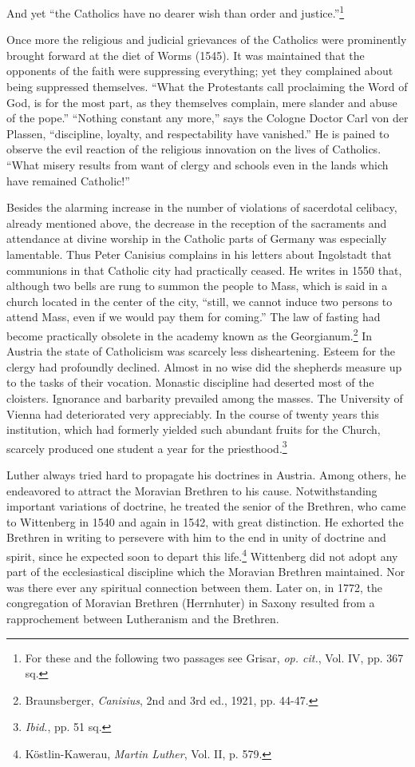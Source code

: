 And yet “the Catholics have no dearer wish than order and justice.”\footnote{For these and the following two passages see Grisar, \textit{op. cit.}, Vol. IV, pp. 367 sq.}

Once more the religious and judicial grievances of the Catholics were
prominently brought forward at the diet of Worms (1545). It was
maintained that the opponents of the faith were suppressing everything;
yet they complained about being suppressed themselves. “What
the Protestants call proclaiming the Word of God, is for the most
part, as they themselves complain, mere slander and abuse of the
pope.” “Nothing constant any more,” says the Cologne Doctor Carl
von der Plassen, “discipline, loyalty, and respectability have vanished.”
He is pained to observe the evil reaction of the religious innovation
on the lives of Catholics. “What misery results from want
of clergy and schools even in the lands which have remained Catholic!”

Besides the alarming increase in the number of violations of sacerdotal
celibacy, already mentioned above, the decrease in the reception
of the sacraments and attendance at divine worship in the Catholic
parts of Germany was especially lamentable. Thus Peter Canisius
complains in his letters about Ingolstadt that communions in that
Catholic city had practically ceased. He writes in 1550 that, although
two bells are rung to summon the people to Mass, which is said in a
church located in the center of the city, “still, we cannot induce two
persons to attend Mass, even if we would pay them for coming.” The
law of fasting had become practically obsolete in the academy known
as the Georgianum.\footnote{Braunsberger, \textit{Canisius}, 2nd and 3rd ed., 1921, pp. 44-47.}
 In Austria the state of Catholicism was scarcely
less disheartening. Esteem for the clergy had profoundly declined.
Almost in no wise did the shepherds measure up to the tasks of their
vocation. Monastic discipline had deserted most of the cloisters.
Ignorance and barbarity prevailed among the masses. The University of
Vienna had deteriorated very appreciably. In the course of twenty
years this institution, which had formerly yielded such abundant
fruits for the Church, scarcely produced one student a year for the
priesthood.\footnote{\textit{Ibid.}, pp. 51 sq.}

Luther always tried hard to propagate his doctrines in Austria.
Among others, he endeavored to attract the Moravian Brethren to
his cause. Notwithstanding important variations of doctrine, he
treated the senior of the Brethren, who came to Wittenberg in 1540
and again in 1542, with great distinction. He exhorted the Brethren
in writing to persevere with him to the end in unity of doctrine and
spirit, since he expected soon to depart this life.\footnote{Köstlin-Kawerau, \textit{Martin Luther}, Vol. II, p. 579.}
Wittenberg did
not adopt any part of the ecclesiastical discipline which the Moravian
Brethren maintained. Nor was there ever any spiritual connection
between them. Later on, in 1772, the congregation of Moravian
Brethren (Herrnhuter) in Saxony resulted from a rapprochement
between Lutheranism and the Brethren.


